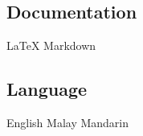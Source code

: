 \documentclass[letterpaper]{deedy-resume} %
\begin{document}

\newpage %

\begin{minipage}[t]{0.33\textwidth} %
\subsection{Documentation}
\LaTeX{} \textbullet{} Markdown \\

\sectionspace

\subsection{Language}
English \textbullet{} Malay \textbullet{} Mandarin
%
\sectionspace
\end{minipage} %
\hfill
\end{document}
